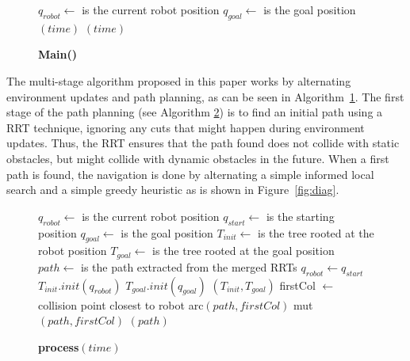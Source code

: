 \documentclass[10pt, conference, compsoc]{IEEEtran}
\begin{document}
\setcounter{algo}{0}

\setcounter{temp}{\value{figure}}
\setcounter{figure}{\value{algo}}
\renewcommand{\figurename}{Algorithm}
\begin{figure}[ht]
    \caption{\bf Main()}
    \label{alg:main}
    \begin{algorithmic}[1]
        \REQUIRE $q_{robot} \leftarrow$ is the current robot position
        \REQUIRE $q_{goal} \leftarrow$ is the goal position
             $(time)$
             $(time)$
        \ENDWHILE
    \end{algorithmic}
\end{figure}
\renewcommand{\figurename}{Figure}
\addtocounter{algo}{1}
\setcounter{figure}{\value{temp}}


The multi-stage algorithm proposed in this paper works by alternating environment
updates and path planning, as can be seen in 
Algorithm~\ref{alg:main}. The first stage of the path planning (see Algorithm \ref{alg:process})
is to find an initial path using a RRT technique, ignoring any cuts that might happen during
environment updates. Thus, the RRT ensures that the path found 
does not collide with static obstacles, but might collide with dynamic obstacles in the future. 
When a first path is found,
the navigation is done by alternating a simple informed local search and 
a simple greedy heuristic as is shown in Figure~\ref{fig:diag}.

\setcounter{temp}{\value{figure}}
\setcounter{figure}{\value{algo}}
\renewcommand{\figurename}{Algorithm}
\begin{figure}[ht]
    \caption{\bf process$(time)$}
    \label{alg:process}
    \begin{algorithmic}[1]
        \REQUIRE $q_{robot} \leftarrow$ is the current robot position
        \REQUIRE $q_{start} \leftarrow$ is the starting position
        \REQUIRE $q_{goal} \leftarrow$ is the goal position
        \REQUIRE $T_{init} \leftarrow$ is the tree rooted at the robot position
        \REQUIRE $T_{goal} \leftarrow$ is the tree rooted at the goal position
        \REQUIRE $path \leftarrow$ is the path extracted from the merged RRTs
        \STATE $q_{robot} \leftarrow q_{start}$
        \STATE $T_{init}.init(q_{robot})$
        \STATE $T_{goal}.init(q_{goal})$
                $(T_{init},T_{goal})$
            \ELSE
                    \STATE firstCol $\leftarrow$ collision point closest to robot
                    \STATE arc$(path, firstCol)$
                    \STATE mut$(path, firstCol)$
                \ENDIF
            \ENDIF
        \ENDWHILE
        $(path)$
    \end{algorithmic}
\end{figure}
\addtocounter{algo}{1}
\renewcommand{\figurename}{Figure}
\setcounter{figure}{\value{temp}}
\end{document}
